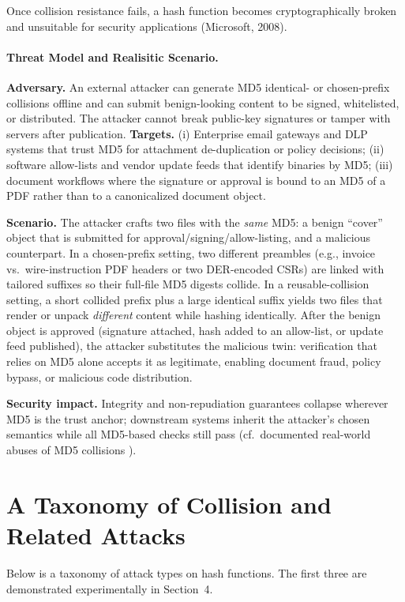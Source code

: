\documentclass[runningheads]{llncs}
\begin{document}
    Once collision resistance fails, a hash function becomes cryptographically broken and unsuitable for security applications (Microsoft, 2008).

    \paragraph{Threat Model and Realisitic Scenario.}
    \textbf{Adversary.} An external attacker can generate MD5 identical- or chosen-prefix collisions offline and can submit benign-looking content to be signed, whitelisted, or distributed. The attacker cannot break public-key signatures or tamper with servers after publication. \textbf{Targets.} (i) Enterprise email gateways and DLP systems that trust MD5 for attachment de-duplication or policy decisions; (ii) software allow-lists and vendor update feeds that identify binaries by MD5; (iii) document workflows where the signature or approval is bound to an MD5 of a PDF rather than to a canonicalized document object.

    \textbf{Scenario.} The attacker crafts two files with the \emph{same} MD5: a benign “cover” object that is submitted for approval/signing/allow-listing, and a malicious counterpart. In a chosen-prefix setting, two different preambles (e.g., invoice vs.\ wire-instruction PDF headers or two DER-encoded CSRs) are linked with tailored suffixes so their full-file MD5 digests collide. In a reusable-collision setting, a short collided prefix plus a large identical suffix yields two files that render or unpack \emph{different} content while hashing identically. After the benign object is approved (signature attached, hash added to an allow-list, or update feed published), the attacker substitutes the malicious twin: verification that relies on MD5 alone accepts it as legitimate, enabling document fraud, policy bypass, or malicious code distribution.

    \textbf{Security impact.} Integrity and non-repudiation guarantees collapse wherever MD5 is the trust anchor; downstream systems inherit the attacker’s chosen semantics while all MD5-based checks still pass (cf.\ documented real-world abuses of MD5 collisions \cite{microsoft,stevens2009crypto}).


    \section{A Taxonomy of Collision and Related Attacks}

    Below is a taxonomy of attack types on hash functions. The first three are demonstrated experimentally in Section~4.
\end{document}
